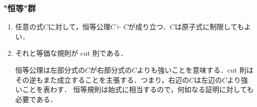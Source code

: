 \documentclass[a4paper,10pt,platex, dvipdfmx]{jsarticle}
\begin{document}
\subsubsection{"恒等"群}
\begin{enumerate}
\item 任意の式$C$に対して，恒等公理$C\vdash C$が成り立つ．$C$は原子式に制限してもよい．
\item それと等価な規則が cut 則である．\begin{prooftree}
\end{prooftree}
恒等公理は左部分式の$C$が右部分式の$C$よりも強いことを意味する．cut 則はその逆もまた成立することを主張する．つまり，右辺の$C$は左辺の$C$より強いことを表わす．
恒等規則は始式に相当するので，何如なる証明に対しても必要である．
\end{enumerate}
\end{document}
